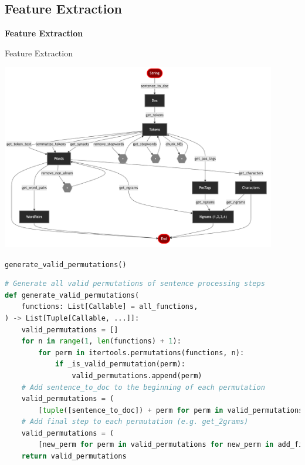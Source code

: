 \documentclass{beamer}
\begin{document}
\subsection{Feature Extraction}
\begin{frame}{}
    \begin{center}
        \Large \textbf{Feature Extraction}
    \end{center}
\end{frame}

\begin{frame}{Feature Extraction}
    \begin{center}
        \includegraphics[width=0.9\textwidth]{figures/mermaid/permutations.md-1.png}
    \end{center}
\end{frame}

\begin{frame}[fragile]{\texttt{generate\_valid\_permutations()}}
    \begin{lstlisting}[language=Python]
# Generate all valid permutations of sentence processing steps
def generate_valid_permutations(
    functions: List[Callable] = all_functions,
) -> List[Tuple[Callable, ...]]:
    valid_permutations = []
    for n in range(1, len(functions) + 1):
        for perm in itertools.permutations(functions, n):
            if _is_valid_permutation(perm):
                valid_permutations.append(perm)
    # Add sentence_to_doc to the beginning of each permutation
    valid_permutations = (
        [tuple([sentence_to_doc]) + perm for perm in valid_permutations])
    # Add final step to each permutation (e.g. get_2grams)
    valid_permutations = (
        [new_perm for perm in valid_permutations for new_perm in add_final_step(perm)])
    return valid_permutations

    \end{lstlisting}
\end{frame}
\end{document}
